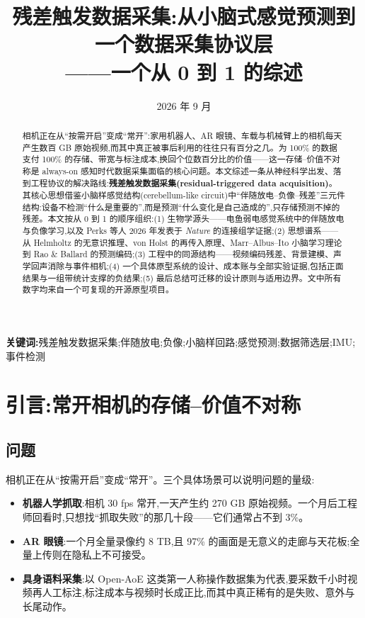 \documentclass[UTF8,12pt,a4paper]{ctexart}
\title{残差触发数据采集:从小脑式感觉预测到一个数据采集协议层\\——一个从 0 到 1 的综述}
\author{}
\date{2026 年 9 月}
\begin{document}
\maketitle

\begin{abstract}
相机正在从``按需开启''变成``常开'':家用机器人、AR 眼镜、车载与机械臂上的相机每天产生数百 GB 原始视频,而其中真正被事后利用的往往只有百分之几。为 100\% 的数据支付 100\% 的存储、带宽与标注成本,换回个位数百分比的价值——这一存储--价值不对称是 always-on 感知时代数据采集面临的核心问题。本文综述一条从神经科学出发、落到工程协议的解决路线:\textbf{残差触发数据采集(residual-triggered data acquisition)}。其核心思想借鉴小脑样感觉结构(cerebellum-like circuit)中``伴随放电--负像--残差''三元件结构:设备不检测``什么是重要的'',而是预测``什么变化是自己造成的'',只存储预测不掉的残差。本文按从 0 到 1 的顺序组织:(1) 生物学源头——电鱼弱电感觉系统中的伴随放电与负像学习,以及 Perks 等人 2026 年发表于 \emph{Nature} 的连接组学证据;(2) 思想谱系——从 Helm\-holtz 的无意识推理、von Holst 的再传入原理、Marr--Albus--Ito 小脑学习理论到 Rao \& Ballard 的预测编码;(3) 工程中的同源结构——视频编码残差、背景建模、声学回声消除与事件相机;(4) 一个具体原型系统的设计、成本账与全部实验证据,包括正面结果与一组带统计支撑的负结果;(5) 最后总结可迁移的设计原则与适用边界。文中所有数字均来自一个可复现的开源原型项目。
\end{abstract}

\textbf{关键词:}残差触发数据采集;伴随放电;负像;小脑样回路;感觉预测;数据筛选层;IMU;事件检测

\tableofcontents
\newpage

\section{引言:常开相机的存储--价值不对称}

\subsection{问题}

相机正在从``按需开启''变成``常开''。三个具体场景可以说明问题的量级:

\begin{itemize}
  \item \textbf{机器人学抓取}:相机 30 fps 常开,一天产生约 270 GB 原始视频。一个月后工程师回看时,只想找``抓取失败''的那几十段——它们通常占不到 3\%。
  \item \textbf{AR 眼镜}:一个月全量录像约 8 TB,且 97\% 的画面是无意义的走廊与天花板;全量上传则在隐私上不可接受。
  \item \textbf{具身语料采集}:以 Open-AoE\cite{openaoe} 这类第一人称操作数据集为代表,要采数千小时视频再人工标注,标注成本与视频时长成正比,而其中真正稀有的是失败、意外与长尾动作。
\end{itemize}
\end{document}

